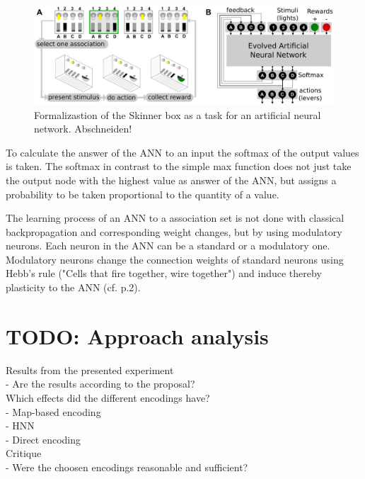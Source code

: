 \documentclass[12pt,twoside]{article}
\theoremstyle{plain}
\theoremstyle{definition}
\theoremstyle{remark}
\begin{document}
\begin{figure}[h]
	\begin{center}
		\includegraphics[width=.9\textwidth]{network_structure.png}
	\end{center}
	\caption{Formalizastion of the Skinner box as a task for an artificial neural network. Abschneiden!}
	\label{fig:formalization}
\end{figure}

To calculate the answer of the ANN to an input the softmax of the output values is taken. The softmax in contrast to the simple max function does not just take the output node with the highest value as answer of the ANN, but assigns a probability to be taken proportional to the quantity of a value.\medskip

The learning process of an ANN to a association set is not done with classical backpropagation and corresponding weight changes, but by using modulatory neurons.
Each neuron in the ANN can be a standard or a modulatory one.
Modulatory neurons change the connection weights of standard neurons using Hebb's rule ("Cells that fire together, wire together") and induce thereby plasticity to the ANN (cf. \cite{citeulike:12788284} p.2).


\section{TODO: Approach analysis}
\label{sec:analysis}

Results from the presented experiment\\
- Are the results according to the proposal?\\
Which effects did the different encodings have?\\
- Map-based encoding\\
- HNN\\
- Direct encoding\\
Critique\\
- Were the choosen encodings reasonable and sufficient?\\

\end{document}
